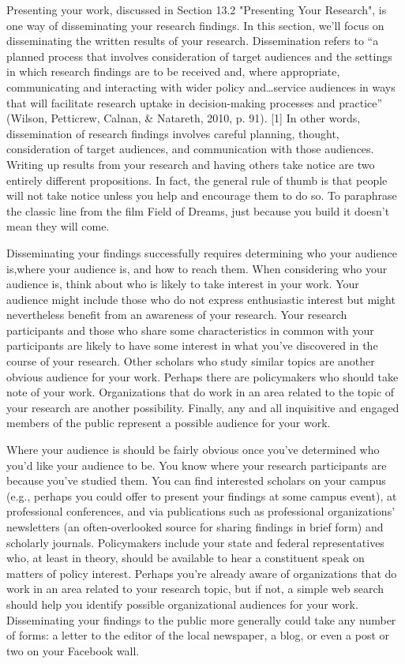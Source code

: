 Presenting your work, discussed in Section 13.2 "Presenting Your Research", is one way of disseminating your research findings. In this section, we’ll focus on disseminating the written results of your research. Dissemination refers to “a planned process that involves consideration of target audiences and the settings in which research findings are to be received and, where appropriate, communicating and interacting with wider policy and…service audiences in ways that will facilitate research uptake in decision-making processes and practice” (Wilson, Petticrew, Calnan, \& Natareth, 2010, p. 91). [1] In other words, dissemination of research findings involves careful planning, thought, consideration of target audiences, and communication with those audiences. Writing up results from your research and having others take notice are two entirely different propositions. In fact, the general rule of thumb is that people will not take notice unless you help and encourage them to do so. To paraphrase the classic line from the film Field of Dreams, just because you build it doesn’t mean they will come.

Disseminating your findings successfully requires determining who your audience is,where your audience is, and how to reach them. When considering who your audience is, think about who is likely to take interest in your work. Your audience might include those who do not express enthusiastic interest but might nevertheless benefit from an awareness of your research. Your research participants and those who share some characteristics in common with your participants are likely to have some interest in what you’ve discovered in the course of your research. Other scholars who study similar topics are another obvious audience for your work. Perhaps there are policymakers who should take note of your work. Organizations that do work in an area related to the topic of your research are another possibility. Finally, any and all inquisitive and engaged members of the public represent a possible audience for your work.

Where your audience is should be fairly obvious once you’ve determined who you’d like your audience to be. You know where your research participants are because you’ve studied them. You can find interested scholars on your campus (e.g., perhaps you could offer to present your findings at some campus event), at professional conferences, and via publications such as professional organizations’ newsletters (an often-overlooked source for sharing findings in brief form) and scholarly journals. Policymakers include your state and federal representatives who, at least in theory, should be available to hear a constituent speak on matters of policy interest. Perhaps you’re already aware of organizations that do work in an area related to your research topic, but if not, a simple web search should help you identify possible organizational audiences for your work. Disseminating your findings to the public more generally could take any number of forms: a letter to the editor of the local newspaper, a blog, or even a post or two on your Facebook wall.

